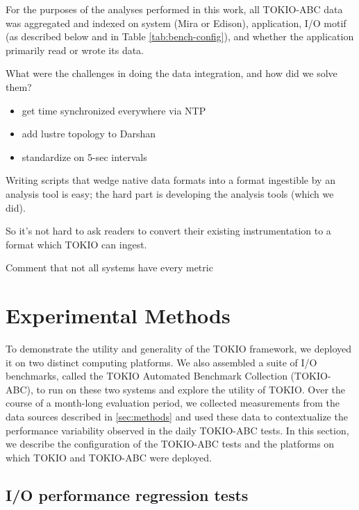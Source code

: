 For the purposes of the analyses performed in this work, all TOKIO-ABC data was aggregated and indexed on system (Mira or Edison), application, I/O motif (as described below and in Table \ref{tab:bench-config}), and whether the application primarily read or wrote its data. 


What were the challenges in doing the data integration, and how did we solve them?

\begin{itemize}
    \item get time synchronized everywhere via NTP
    \item add lustre topology to Darshan
    \item standardize on 5-sec intervals
\end{itemize}

Writing scripts that wedge native data formats into a format ingestible by an analysis tool is easy; the hard part is developing the analysis tools (which we did).

So it's not hard to ask readers to convert their existing instrumentation to a format which TOKIO can ingest.

Comment that not all systems have every metric

\section{Experimental Methods} \label{sec:platforms}

To demonstrate the utility and generality of the TOKIO framework, we deployed it on two distinct computing platforms.
We also assembled a suite of I/O benchmarks, called the TOKIO Automated Benchmark Collection (TOKIO-ABC), to run on these two systems and explore the utility of TOKIO.  
Over the course of a month-long evaluation period, we collected measurements from the data sources described in \ref{sec:methods} and used these data to contextualize the performance variability observed in the daily TOKIO-ABC tests.
In this section, we describe the configuration of the TOKIO-ABC tests and the platforms on which TOKIO and TOKIO-ABC were deployed.

\subsection{I/O performance regression tests} \label{sec:methods/tests}

